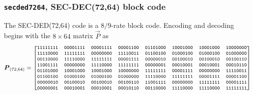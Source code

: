 \subsubsection{{\tt secded7264}, SEC-DEC(72,64) block code}
\label{module:fec:secded:7264}
The SEC-DED(72,64) code is a $8/9$-rate block code.
Encoding and decoding begins with the $8 \times 64$ matrix $\vec{P}$ as
%
\begin{equation*}
    \vec{P}_{(72,64)} = 
    \footnotesize{
    \begin{bmatrix}
        {\tt 11111111} & {\tt 00001111} & {\tt 00001111} & {\tt 00001100} & {\tt 01101000} & {\tt 10001000} & {\tt 10001000} & {\tt 10000000} \\
        {\tt 11110000} & {\tt 11111111} & {\tt 00000000} & {\tt 11110011} & {\tt 01100100} & {\tt 01000100} & {\tt 01000100} & {\tt 01000000} \\
        {\tt 00110000} & {\tt 11110000} & {\tt 11111111} & {\tt 00001111} & {\tt 00000010} & {\tt 00100010} & {\tt 00100010} & {\tt 00100110} \\
        {\tt 11001111} & {\tt 00000000} & {\tt 11110000} & {\tt 11111111} & {\tt 00000001} & {\tt 00010001} & {\tt 00010001} & {\tt 00010110} \\
        {\tt 01101000} & {\tt 10001000} & {\tt 10001000} & {\tt 10000000} & {\tt 11111111} & {\tt 00001111} & {\tt 00000000} & {\tt 11110011} \\
        {\tt 01100100} & {\tt 01000100} & {\tt 01000100} & {\tt 01000000} & {\tt 11110000} & {\tt 11111111} & {\tt 00001111} & {\tt 00001100} \\
        {\tt 00000010} & {\tt 00100010} & {\tt 00100010} & {\tt 00100110} & {\tt 11001111} & {\tt 00000000} & {\tt 11111111} & {\tt 00001111} \\
        {\tt 00000001} & {\tt 00010001} & {\tt 00010001} & {\tt 00010110} & {\tt 00110000} & {\tt 11110000} & {\tt 11110000} & {\tt 11111111} \\
    \end{bmatrix}
    }
\end{equation*}
%


